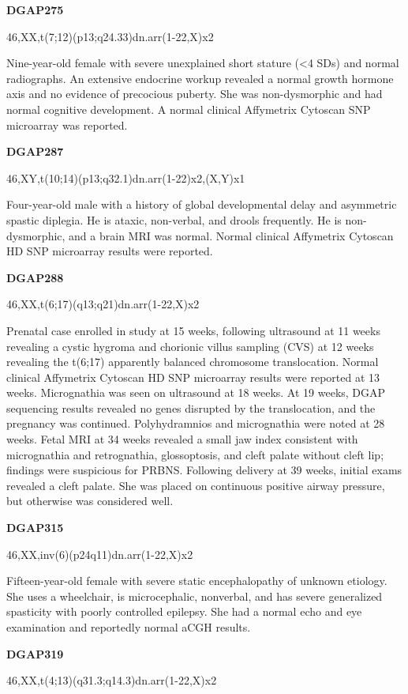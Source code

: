 \documentclass[a4paper,twoside=true,openright,parskip=full,chapterprefix=true,11pt,headings=normal,bibliography=totoc,listof=totoc,titlepage=on,captions=tableabove,draft=false]{scrreprt}
\theoremstyle{definition}
\theoremstyle{definition}
\theoremstyle{definition}
\theoremstyle{remark}
\begin{document}
\textbf{DGAP275}

46,XX,t(7;12)(p13;q24.33)dn.arr(1-22,X)x2

Nine-year-old female with severe unexplained short stature (\textless{}4
SDs) and normal radiographs. An extensive endocrine workup revealed a
normal growth hormone axis and no evidence of precocious puberty. She
was non-dysmorphic and had normal cognitive development. A normal
clinical Affymetrix Cytoscan SNP microarray was reported.

\textbf{DGAP287}

46,XY,t(10;14)(p13;q32.1)dn.arr(1-22)x2,(X,Y)x1

Four-year-old male with a history of global developmental delay and
asymmetric spastic diplegia. He is ataxic, non-verbal, and drools
frequently. He is non-dysmorphic, and a brain MRI was normal. Normal
clinical Affymetrix Cytoscan HD SNP microarray results were reported.

\textbf{DGAP288}

46,XX,t(6;17)(q13;q21)dn.arr(1-22,X)x2

Prenatal case enrolled in study at 15 weeks, following ultrasound at 11
weeks revealing a cystic hygroma and chorionic villus sampling (CVS) at
12 weeks revealing the t(6;17) apparently balanced chromosome
translocation. Normal clinical Affymetrix Cytoscan HD SNP microarray
results were reported at 13 weeks. Micrognathia was seen on ultrasound
at 18 weeks. At 19 weeks, DGAP sequencing results revealed no genes
disrupted by the translocation, and the pregnancy was continued.
Polyhydramnios and micrognathia were noted at 28 weeks. Fetal MRI at 34
weeks revealed a small jaw index consistent with micrognathia and
retrognathia, glossoptosis, and cleft palate without cleft lip; findings
were suspicious for PRBNS. Following delivery at 39 weeks, initial exams
revealed a cleft palate. She was placed on continuous positive airway
pressure, but otherwise was considered well.

\textbf{DGAP315}

46,XX,inv(6)(p24q11)dn.arr(1-22,X)x2

Fifteen-year-old female with severe static encephalopathy of unknown
etiology. She uses a wheelchair, is microcephalic, nonverbal, and has
severe generalized spasticity with poorly controlled epilepsy. She had a
normal echo and eye examination and reportedly normal aCGH results.

\textbf{DGAP319}

46,XX,t(4;13)(q31.3;q14.3)dn.arr(1-22,X)x2
\end{document}
